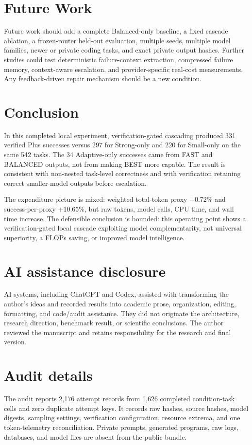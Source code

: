 \documentclass[10pt]{article}
\begin{document}
\section{Future Work}
Future work should add a complete Balanced-only baseline, a fixed cascade
ablation, a frozen-router held-out evaluation, multiple seeds, multiple model
families, newer or private coding tasks, and exact private output hashes.
Further studies could test deterministic failure-context extraction, compressed
failure memory, context-aware escalation, and provider-specific real-cost
measurements. Any feedback-driven repair mechanism should be a new condition.

\section{Conclusion}
In this completed local experiment, verification-gated cascading produced 331
verified Plus successes versus 297 for Strong-only and 220 for Small-only on
the same 542 tasks. The 34 Adaptive-only successes came from FAST and
BALANCED outputs, not from making BEST more capable. The result is consistent
with non-nested task-level correctness and with verification retaining correct
smaller-model outputs before escalation.

The expenditure picture is mixed: weighted total-token proxy +0.72\% and
success-per-proxy +10.65\%, but raw tokens, model calls, CPU time, and wall
time increase. The defensible conclusion is bounded: this operating point
shows a verification-gated local cascade exploiting model complementarity,
not universal superiority, a FLOPs saving, or improved model intelligence.

\section*{AI assistance disclosure}
AI systems, including ChatGPT and Codex, assisted with transforming the
author's ideas and recorded results into academic prose, organization,
editing, formatting, and code/audit assistance. They did not originate the
architecture, research direction, benchmark result, or scientific
conclusions. The author reviewed the manuscript and retains responsibility for
the research and final version.




\appendix
\section{Audit details}
The audit reports 2,176 attempt records from 1,626 completed condition-task
cells and zero duplicate attempt keys. It records raw hashes, source hashes,
model digests, sampling settings, verification configuration, resource
extrema, and one token-telemetry reconciliation. Private prompts, generated
programs, raw logs, databases, and model files are absent from the public
bundle.
\end{document}
